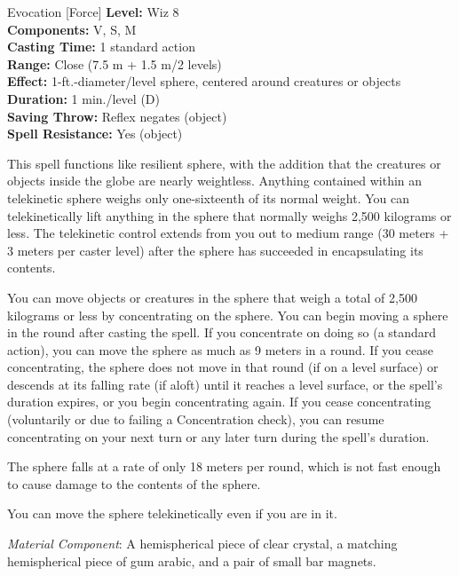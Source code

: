 {Evocation [Force]}
{
	\textbf{Level:}
	Wiz 8\\
	\textbf{Components:}
	V, S, M\\
	\textbf{Casting Time:}
	1 standard action\\
	\textbf{Range:}
	Close (7.5 m + 1.5 m/2 levels)\\
	\textbf{Effect:}
	1-ft.-diameter/level sphere, centered around creatures or objects\\
	\textbf{Duration:}
	1 min./level (D)\\
	\textbf{Saving Throw:}
	Reflex negates (object)\\
	\textbf{Spell Resistance:}
	Yes (object)\\
}
{
	This spell functions like resilient sphere, with the addition that the creatures or objects inside the globe are nearly weightless. Anything contained within an telekinetic sphere weighs only one-sixteenth of its normal weight. You can telekinetically lift anything in the sphere that normally weighs 2,500 kilograms or less. The telekinetic control extends from you out to medium range (30 meters + 3 meters per caster level) after the sphere has succeeded in encapsulating its contents.

	You can move objects or creatures in the sphere that weigh a total of 2,500 kilograms or less by concentrating on the sphere. You can begin moving a sphere in the round after casting the spell. If you concentrate on doing so (a standard action), you can move the sphere as much as 9 meters in a round. If you cease concentrating, the sphere does not move in that round (if on a level surface) or descends at its falling rate (if aloft) until it reaches a level surface, or the spell's duration expires, or you begin concentrating again. If you cease concentrating (voluntarily or due to failing a Concentration check), you can resume concentrating on your next turn or any later turn during the spell's duration.

	The sphere falls at a rate of only 18 meters per round, which is not fast enough to cause damage to the contents of the sphere.

	You can move the sphere telekinetically even if you are in it.

	\textit{Material Component}:
	A hemispherical piece of clear crystal, a matching hemispherical piece of gum arabic, and a pair of small bar magnets.

}
